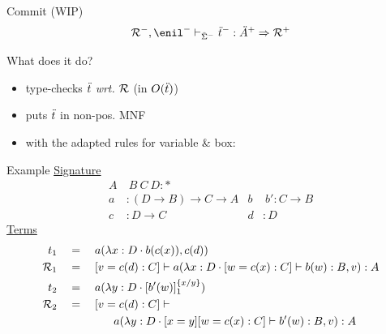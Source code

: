\documentclass[ignorenonframetext,red]{beamer}
\begin{document}
\begin{frame}{\textsf{Commit} (WIP)}
  \inXLF
  {\Large \[ \jindex{\msi^-}{\pair{\mr^-}{\enil^-}}{\typ{\mo^-}{\mf^+}} \To{\mr^+} \]}
  \begin{block}{What does it do?}
    \begin{itemize}
    \item type-checks $\mo$ \emph{wrt.} $\mr$ (in $O(\mo)$)
    \item puts $\mo$ in non-pos. \textsf{MNF}
    \item with the adapted rules for variable \& box:
      \small
      \begin{mathpar}

      \end{mathpar}
    \end{itemize}
  \end{block}
\end{frame}

\begin{frame}{Example}
  \underline{Signature}
  \begin{align*}
    A&\ B\ C\ D : * \\
    a &: (D\to B)\to C\to A     & b&\ b' : C\to B \\
    c &: D\to C                 & d &: D
  \end{align*}
  \underline{Terms}
  \begin{align*}
    t_1\quad&=\quad
    \lapp a {\lcons{\lam x D \lapp b {\lapp c x}}{\lapp c d}} \\
    \mr_1\quad&=\quad
    \sent v {\lapp c d : C} \vdash \lapp a {\lcons{\lam x D
        \sent w {\lapp c x : C}\vdash \lapp b w : B}{v}} : A \\
    t_2 \quad&=\quad
    \lapp a {\lam y D {\ibox {\lapp{b'} w} 1 x y}} \\
    \mr_2\quad&=\quad
    \sent v {\lapp c d : C} \vdash \\ &\qquad\qquad \lapp a {\lcons{\lam y D
        \sent x y \sent w {\lapp c x : C}\vdash \lapp {b'} w : B}{v}} : A
  \end{align*}
\end{frame}
\end{document}
